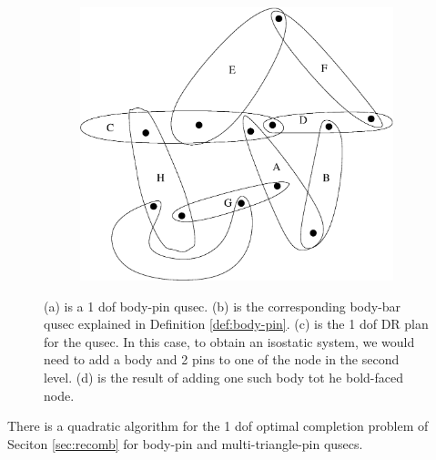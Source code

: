 \begin{figure}
\begin{subfigure}{0.3\linewidth}
\begin{tikzpicture}
    \end{tikzpicture}
    \caption{}
\end{subfigure}
\begin{subfigure}{0.2\linewidth}\centering
    \includegraphics[width=\linewidth]{img/bodypin2}
    \caption{}
\end{subfigure}

    
\caption{(a) is a 1 dof body-pin qusec. (b) is the corresponding body-bar qusec explained in Definition \ref{def:body-pin}. (c) is the 1 dof DR plan for the qusec. In this case, to obtain an isostatic system, we would need to add a body and 2 pins to one of the node in the second level. (d) is the result of adding one such body tot he bold-faced node.}

\end{figure}

\begin{theorem}
    There is a quadratic algorithm for the 1 dof optimal completion problem of Seciton \ref{sec:recomb} for body-pin and multi-triangle-pin qusecs.
\end{theorem}

